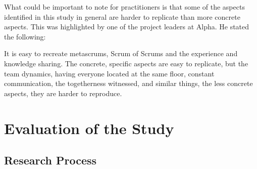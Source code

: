 What could be important to note for practitioners is that some of the aspects identified in this study in general are harder to replicate than more concrete aspects. This was highlighted by one of the project leaders at Alpha. He stated the following:

\begin{fancyquotes}
It is easy to recreate metascrums, Scrum of Scrums and the experience and knowledge sharing. The concrete, specific aspects are easy to replicate, but the team dynamics, having everyone located at the same floor, constant communication, the togetherness witnessed, and similar things, the less concrete aspects, they are harder to reproduce.
\end{fancyquotes}

\section{Evaluation of the Study}

\subsection{Research Process}

